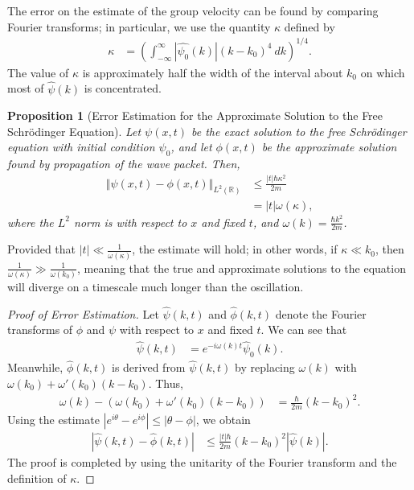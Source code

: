 \documentclass[12pt]{extarticle}
\newcommand{\R}{\mathbb{R}}
\newcommand{\norm}[1]{\left\Vert #1\right\Vert}
\theoremstyle{plain}
\newtheorem*{proposition}{Proposition}%
\theoremstyle{definition}
\theoremstyle{remark}
\begin{document}
    The error on the estimate of the group velocity can be found by comparing Fourier transforms; in particular, we use the quantity $\kappa$ defined by
    \begin{align*}
      \kappa &= \left(\int_{-\infty}^{\infty} \left\vert \hat{\psi_0}(k) \right\vert\left(k-k_0\right)^4\:dk\right)^{1/4}.
    \end{align*}
    The value of $\kappa$ is approximately half the width of the interval about $k_0$ on which most of $\hat{\psi}(k)$ is concentrated.
    \begin{proposition}[Error Estimation for the Approximate Solution to the Free Schrödinger Equation]
      Let $\psi(x,t)$ be the exact solution to the free Schrödinger equation with initial condition $\psi_0$, and let $\phi(x,t)$ be the approximate solution found by propagation of the wave packet. Then,
      \begin{align*}
        \norm{\psi(x,t) - \phi(x,t)}_{L^{2}(\R)} &\leq \frac{|t|\hbar \kappa^2}{2m}\\
                                                 &= |t|\omega(\kappa),
      \end{align*}
      where the $L^2$ norm is with respect to $x$ and fixed $t$, and $\omega(k) = \frac{\hbar k^2}{2m}$.
    \end{proposition}
    Provided that $|t| \ll \frac{1}{\omega(\kappa)}$, the estimate will hold; in other words, if $\kappa \ll k_0$, then $\frac{1}{\omega(\kappa)} \gg \frac{1}{\omega(k_0)}$, meaning that the true and approximate solutions to the equation will diverge on a timescale much longer than the oscillation.
    \begin{proof}[Proof of Error Estimation]
      Let $\hat{\psi}(k,t)$ and $\hat{\phi}(k,t)$ denote the Fourier transforms of $\phi$ and $\psi$ with respect to $x$ and fixed $t$. We can see that
      \begin{align*}
        \hat{\psi}(k,t) &= e^{-i\omega(k)t}\hat{\psi}_0(k).
      \end{align*}
      Meanwhile, $\hat{\phi}(k,t)$ is derived from $\hat{\psi}(k,t)$ by replacing $\omega(k)$ with $\omega(k_0) + \omega'(k_0)(k-k_0)$. Thus,
      \begin{align*}
        \omega(k) - \left(\omega(k_0) + \omega'(k_0)(k-k_0)\right) &= \frac{\hbar }{2m}(k-k_0)^2.
      \end{align*}
      Using the estimate $\left\vert e^{i\theta} - e^{i\phi} \right\vert \leq \left\vert \theta - \phi \right\vert$, we obtain
      \begin{align*}
        \left\vert \hat{\psi}(k,t) - \hat{\phi}(k,t) \right\vert &\leq \frac{|t|\hbar}{2m}(k-k_0)^2 \left\vert \hat{\psi}(k) \right\vert.
      \end{align*}
      The proof is completed by using the unitarity of the Fourier transform and the definition of $\kappa$.
    \end{proof}
\end{document}
